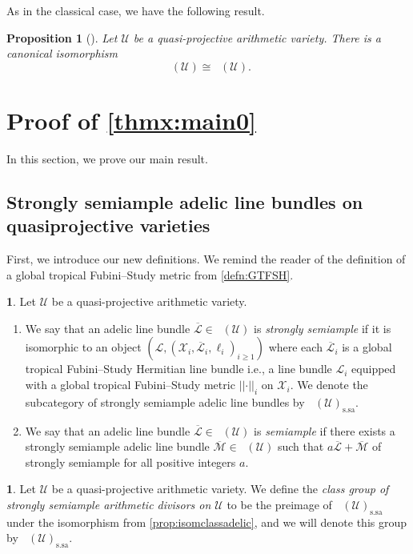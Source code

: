 \documentclass[11pt,reqno]{amsart}
\newcommand{\cX}{\mathcal{X}}
\newcommand{\cU}{\mathcal{U}}
\newcommand{\cM}{\mathcal{M}}
\newcommand{\cL}{\mathcal{L}}
\newcommand{\nrm}[1]{\left|\left |#1\right |\right |}
\theoremstyle{theorem}
\numberwithin{equation}{subsection}
\newtheorem{prop}[subsubsection]{Proposition}
\numberwithin{equation}{subsection}
\theoremstyle{definition}
\newtheorem{definition}[subsubsection]{\text{Definition}}
\theoremstyle{remark}
\numberwithin{equation}{subsubsection} \numberwithin{figure}{section}
\DeclareMathOperator{\aPic}{\widehat{Pic}}
\DeclareMathOperator{\acPic}{\widehat{\underline{Pic}}}
\DeclareMathOperator{\aCaCl}{\widehat{CaCl}}
\newcommand{\cdef}[1]{\textsf{\textit{#1}}}
\renewcommand{\geq}{\geqslant}
\DeclareMathOperator{\ssa}{s.sa}
\begin{document}
As in the classical case, we have the following result.

\begin{prop}[]\label{prop:isomclassadelic}
Let $\cU$ be a quasi-projective arithmetic variety. There is a canonical isomorphism
\[
\aCaCl(\cU) \cong \aPic(\cU).
\]
\end{prop}


\section{Proof of \autoref{thmx:main0}}
\label{sec:proofs}
In this section, we prove our main result. 

\subsection{Strongly semiample adelic line bundles on quasiprojective varieties}
First, we introduce our new definitions. 
We remind the reader of the definition of a global tropical Fubini--Study metric from \autoref{defn:GTFSH}. 

\begin{definition}\label{defn:ssalinebundles}
Let $\cU$ be a quasi-projective arithmetic variety. 
\begin{enumerate}
\item We say that an adelic line bundle $\overline{\cL} \in \acPic(\cU)$ is \cdef{strongly semiample} if it is isomorphic to an object $(\cL,(\cX_i,\overline{\cL}_i,\ell_i)_{i\geq 1})$ where each $\overline{\cL}_i$ is a global tropical Fubini--Study Hermitian line bundle i.e., a line bundle $\cL_i$ equipped with a global tropical Fubini--Study metric $\nrm{\cdot}_i$ on $\cX_i$. 
We denote the subcategory of strongly semiample adelic line bundles by $\acPic(\cU)_{\ssa}$. 
\item We say that an adelic line bundle $\overline{\cL} \in \acPic(\cU)$ is \cdef{semiample} if there exists a strongly semiample adelic line bundle $\overline{\cM} \in \acPic(\cU)$ such that $a\overline{\cL} + \overline{\cM}$ of strongly semiample for all positive integers $a$. 
\end{enumerate}
\end{definition}

\begin{definition}\label{defn:ssadivisors}
Let $\cU$ be a quasi-projective arithmetic variety. 
We define the \cdef{class group of strongly semiample arithmetic divisors on $\cU$} to be the preimage of $\aPic(\cU)_{\ssa}$ under the isomorphism from \autoref{prop:isomclassadelic}, and we will denote this group by $\aCaCl(\cU)_{\ssa}$. 
\end{definition}
\end{document}
